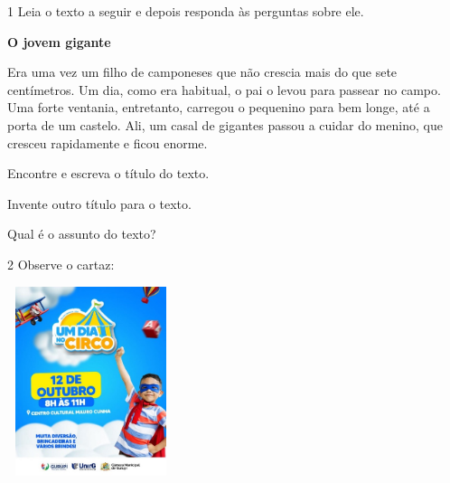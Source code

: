 
\num{1} Leia o texto a seguir e depois responda às perguntas sobre ele. 

\textbf{O jovem gigante}

Era uma vez um filho de camponeses que não crescia mais do que sete
centímetros. Um dia, como era habitual, o pai o levou para passear no
campo. Uma forte ventania, entretanto, carregou o pequenino para bem
longe, até a porta de um castelo. Ali, um casal de gigantes passou a
cuidar do menino, que cresceu rapidamente e ficou enorme.


\begin{escolha}
\item Encontre e escreva o título do texto.


\item Invente outro título para o texto.


\item Qual é o assunto do texto?

\end{escolha}

\num{2} Observe o cartaz:


\includegraphics[width=1.92500in,height=2.18056in]{media/image119.jpeg}

